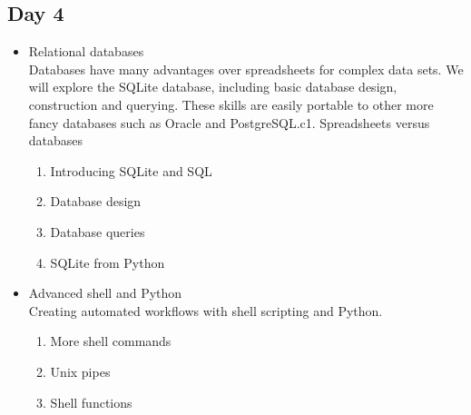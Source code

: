 \documentclass[11pt,letter]{article}
\begin{document}
\subsection{Day 4}
\label{sec-1-4}
\begin{itemize}

\item Relational databases\\
\label{sec-1-4-1}%
Databases have many advantages over spreadsheets for complex data sets. We will explore the SQLite database, including basic database design, construction and querying. These skills are easily portable to other more fancy databases such as Oracle and PostgreSQL.c1. Spreadsheets versus databases
\begin{enumerate}
\item Introducing SQLite and SQL
\item Database design
\item Database queries
\item SQLite from Python
\end{enumerate}

\item Advanced shell and Python\\
\label{sec-1-4-2}%
Creating automated workflows with shell scripting and Python.
\begin{enumerate}
\item More shell commands
\item Unix pipes
\item Shell functions
\end{enumerate}
\end{itemize} %
\end{document}
